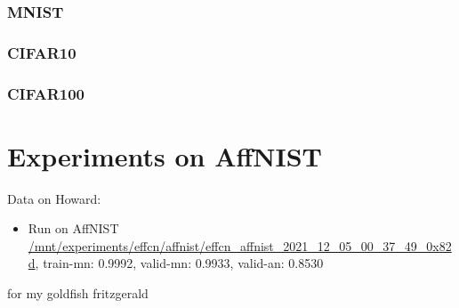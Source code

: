 \documentclass{article}
\begin{document}
\subsubsection{MNIST}
\subsubsection{CIFAR10}
\subsubsection{CIFAR100}
  

\section{Experiments on AffNIST}

Data on Howard:
\begin{itemize}
	\item Run on AffNIST \url{/mnt/experiments/effcn/affnist/effcn_affnist_2021_12_05_00_37_49_0x82d}, train-mn: 0.9992, valid-mn: 0.9933, valid-an: 0.8530
\end{itemize}

\begin{ack}
for my goldfish fritzgerald
\end{ack}



\end{document}
